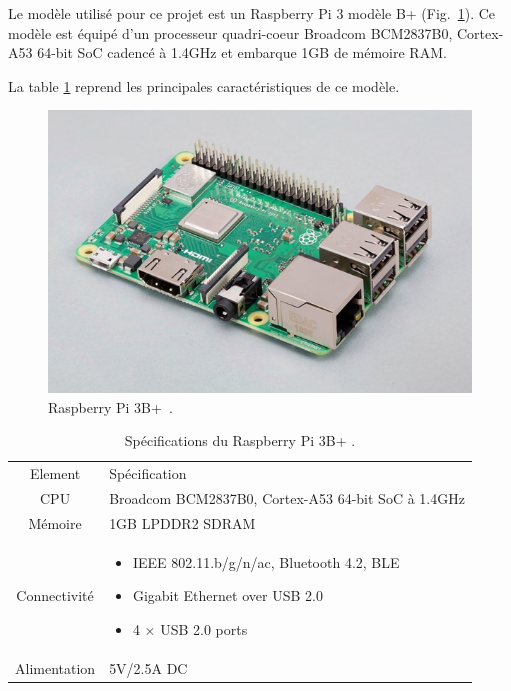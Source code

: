 Le modèle utilisé pour ce projet est un Raspberry Pi 3 modèle B+ (Fig.~\ref{fig:state-raspberrypi}). Ce modèle est équipé d'un processeur quadri-coeur Broadcom BCM2837B0, Cortex-A53 64-bit SoC cadencé à 1.4GHz et embarque 1GB de mémoire RAM. 

La table \ref{tb:state-raspberrypi-spec} reprend les principales caractéristiques de ce modèle.

\begin{figure}[H]
    \centering
    \includegraphics[scale=0.35]{res/pictures/raspberrypi3b+.png}
    \caption{Raspberry Pi 3B+~\cite{raspberry:shop}.}
    \label{fig:state-raspberrypi}
\end{figure}

\begin{table}[H]
    \centering
    \begin{tabular}{|c|p{}|}
        \hline
        \rowcolor{lightgray}
        Element            & Spécification\\
        CPU & Broadcom BCM2837B0, Cortex-A53 64-bit SoC à 1.4GHz\\ \hline
        Mémoire & 1GB LPDDR2 SDRAM \\ \hline
        Connectivité & 
        \begin{itemize}
            \item IEEE 802.11.b/g/n/ac, Bluetooth 4.2, BLE
            \item Gigabit Ethernet over USB 2.0
            \item 4 × USB 2.0 ports
        \end{itemize}\\ \hline
        Alimentation & 5V/2.5A DC\\ \hline
    \end{tabular}
    \caption{Spécifications du Raspberry Pi 3B+ \cite{raspberry:shop}.}
    \label{tb:state-raspberrypi-spec}
\end{table}

